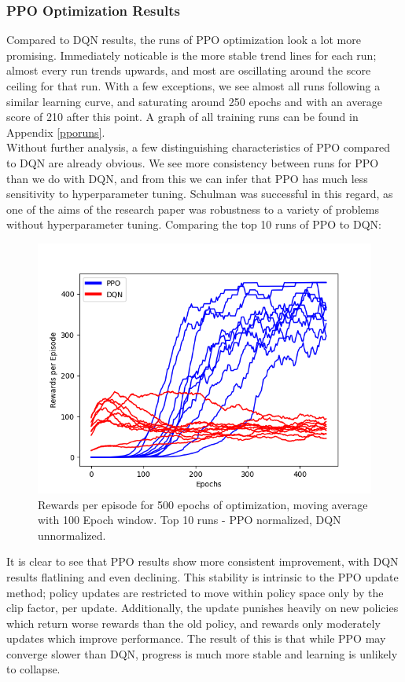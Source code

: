 \documentclass[12pt]{article}
\begin{document}
\subsubsection{PPO Optimization Results}
Compared to DQN results, the runs of PPO optimization look a lot more promising. Immediately noticable is the more stable trend lines for each run; almost every run trends upwards, and most are oscillating around the score ceiling for that run. With a few exceptions, we see almost all runs following a similar learning curve, and saturating around 250 epochs and with an average score of 210 after this point. A graph of all training runs can be found in Appendix \ref{pporuns}.\\\newline
Without further analysis, a few distinguishing characteristics of PPO compared to DQN are already obvious. We see more consistency between runs for PPO than we do with DQN, and from this we can infer that PPO has much less sensitivity to hyperparameter tuning. Schulman was successful in this regard, as one of the aims of the research paper \autocite{schulman2017proximal} was robustness to a variety of problems without hyperparameter tuning. Comparing the top 10 runs of PPO to DQN:
\begin{figure}[H]
    \centering
    \includegraphics[scale=0.7]{15.png}
    \caption{Rewards per episode for 500 epochs of optimization, moving average with 100 Epoch window. Top 10 runs - PPO normalized, DQN unnormalized.}
\end{figure}
It is clear to see that PPO results show more consistent improvement, with DQN results flatlining and even declining. This stability is intrinsic to the PPO update method; policy updates are restricted to move within policy space only by the clip factor, per update. Additionally, the update punishes heavily on new policies which return worse rewards than the old policy, and rewards only moderately updates which improve performance. The result of this is that while PPO may converge slower than DQN, progress is much more stable and learning is unlikely to collapse. \\\newline
\end{document}
